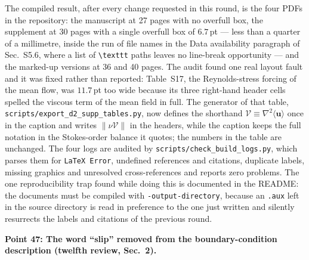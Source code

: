 \documentclass[11pt,a4paper]{article}
\begin{document}
The compiled result, after every change requested in this round, is the four PDFs in the
repository: the manuscript at 27 pages with no overfull box, the supplement at 30 pages
with a single overfull box of $6.7$\,pt --- less than a quarter of a millimetre, inside
the run of file names in the Data availability paragraph of Sec.~S5.6, where a list of
\texttt{\textbackslash texttt} paths leaves no line-break opportunity --- and the
marked-up versions at 36 and 40 pages. The audit found one real layout fault and it was
fixed rather than reported: Table~S17, the Reynolds-stress forcing of the mean flow, was
$11.7$\,pt too wide because its three right-hand header cells spelled the viscous term of
the mean field in full. The generator of that table,
\texttt{scripts/}\hspace{0pt}\texttt{export\_d2\_supp\_tables.py}, now defines the
shorthand \(\mathcal{V}\equiv\nabla^{2}\langle\mathbf{u}\rangle\) once in the caption and
writes \(\|\nu\mathcal{V}\|\) in the headers, while the caption keeps the full notation in
the Stokes-order balance it quotes; the numbers in the table are unchanged. The four logs
are audited by \texttt{scripts/}\hspace{0pt}\texttt{check\_build\_logs.py},
which parses them for \texttt{LaTeX Error}, undefined references and citations, duplicate
labels, missing graphics and unresolved cross-references and reports zero problems. The
one reproducibility trap found while doing this is documented in the README: the
documents must be compiled with \texttt{-output-directory}, because an \texttt{.aux} left
in the source directory is read in preference to the one just written and silently
resurrects the labels and citations of the previous round.

\vspace{1em}

\noindent\textbf{Point 47: The word ``slip'' removed from the boundary-condition
description (twelfth review, Sec.~2).}
\end{document}

